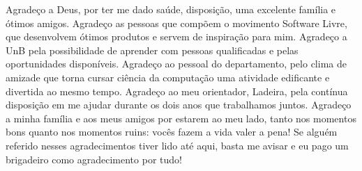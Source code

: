 Agradeço a Deus, por ter me dado saúde, disposição, uma excelente família e ótimos
amigos. 
Agradeço as pessoas que compõem o movimento Software Livre, que desenvolvem ótimos
produtos e servem de inspiração para mim. 
Agradeço a UnB pela possibilidade de aprender com pessoas qualificadas e pelas 
oportunidades disponíveis.
Agradeço ao pessoal do departamento, pelo clima de
amizade que torna cursar ciência da computação uma atividade edificante e divertida
ao mesmo tempo. 
Agradeço ao meu orientador, Ladeira, pela contínua disposição em me ajudar durante
os dois anos que trabalhamos juntos.  
Agradeço a minha família e aos meus amigos por estarem ao meu lado, tanto nos
momentos bons quanto nos momentos ruins: vocês fazem a vida valer a pena! 
Se alguém referido nesses agradecimentos tiver lido até aqui, basta me avisar e eu
pago um brigadeiro como agradecimento por tudo!
